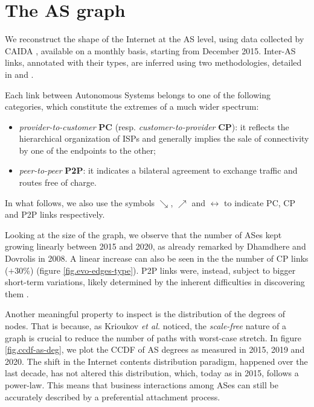 \documentclass[a4paper,11pt,oneside]{report}
\begin{document}
\chapter{The AS graph}
\label{chap.as-graph}

We reconstruct the shape of the Internet at the AS level, using data collected by CAIDA \cite{GraphCAIDA}, available on a monthly basis, starting from December 2015. Inter-AS links, annotated with their types, are inferred using two methodologies, detailed in \cite{luckieRelationshipsCustomerCones2013} and \cite{giotsasInferringMultilateralPeering2013}.

\bigskip
Each link between Autonomous Systems belongs to one of the following categories, which constitute the extremes of a much wider spectrum:
\begin{itemize}
\item \emph{provider-to-customer} \textbf{PC} (resp. \emph{customer-to-provider} \textbf{CP}): it reflects the hierarchical organization of ISPs and generally implies the sale of connectivity by one of the endpoints to the other;
\item \emph{peer-to-peer} \textbf{P2P}: it indicates a bilateral agreement to exchange traffic and routes free of charge.
\end{itemize}
In what follows, we also use the symbols $\searrow$, $\nearrow$ and $\longleftrightarrow$ to indicate PC, CP and P2P links respectively.

\bigskip
Looking at the size of the graph, we observe that the number of ASes kept growing linearly between 2015 and 2020, as already remarked by Dhamdhere and Dovrolis \cite{dhamdhereTenYearsEvolution2008} in 2008. A linear increase can also be seen in the the number of CP links ($+30\%$) (figure \ref{fig.evo-edges-type}). P2P links were, instead, subject to bigger short-term variations, likely determined by the inherent difficulties in discovering them \cite{dhamdhereTenYearsEvolution2008}.

\bigskip
Another meaningful property to inspect is the distribution of the degrees of nodes. That is because, as Krioukov \textit{et al.} \cite{krioukovCompactRoutingInternet2007} noticed, the \emph{scale-free} nature of a graph is crucial to reduce the number of paths with worst-case stretch. In figure \ref{fig.ccdf-as-deg}, we plot the CCDF of AS degrees as measured in 2015, 2019 and 2020. The shift in the Internet contents distribution paradigm, happened over the last decade, has not altered this distribution, which, today as in 2015, follows a power-law. This means that business interactions among ASes can still be accurately described by a preferential attachment process.
\end{document}
